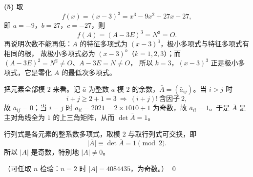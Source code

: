 \begin{solution}
\textbf{(5)} 取
\[
f(x)=(x-3)^{3}=x^{3}-9x^{2}+27x-27 ,
\]
即 $a=-9$，$b=27$，$c=-27$，则
\[
f(A)=(A-3E)^{3}=N^{3}=O .
\]
再说明次数不能再低：$A$ 的特征多项式为 $(x-3)^{3}$，极小多项式与特征多项式有相同的根，
故极小多项式必为 $(x-3)^{k}$（$k=1,2,3$）；而 $(A-3E)^{2}=N^{2}\ne O$、$A-3E=N\ne O$，
所以 $k=3$，$(x-3)^{3}$ 正是极小多项式，它是零化 $A$ 的最低次多项式。
\end{solution}

\begin{solution}
把元素全部模 $2$ 来看。记 $\bar{a}$ 为整数 $a$ 模 $2$ 的余数，$\bar A=(\bar a_{ij})$。当 $i>j$ 时
\[
i+j\ge2+1=3\ \Longrightarrow\ (i+j)!\ \text{含因子}\ 2,
\]
故 $\bar a_{ij}=0$；当 $i=j$ 时 $a_{ii}=2021=2\times1010+1$ 为奇数，故 $\bar a_{ii}=1$。于是 $\bar A$ 是
主对角线全为 $1$ 的上三角矩阵，从而 $\det\bar A=1$。

行列式是各元素的整系数多项式，取模 $2$ 与取行列式可交换，即
\[
\overline{|A|}\equiv\det\bar A=1\pmod 2 .
\]
所以 $|A|$ 是奇数，特别地 $|A|\ne0$。

（可任取 $n$ 检验：$n=2$ 时 $|A|=4084435$，为奇数。）
\qed
\end{solution}

